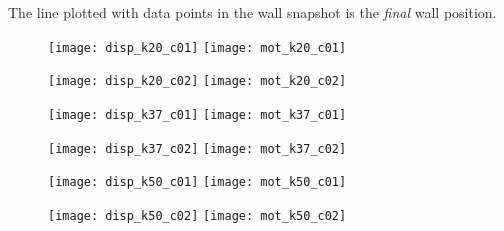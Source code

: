 \documentclass[a4paper,10pt]{article}
\begin{document}
The line plotted with data points in the wall snapshot is the \emph{final} wall position.

\begin{figure}[htb]
\centering
 \texttt{[image: disp\_k20\_c01]}
 \texttt{[image: mot\_k20\_c01]}
\end{figure}

\begin{figure}[htb]
\centering
 \texttt{[image: disp\_k20\_c02]}
 \texttt{[image: mot\_k20\_c02]}
\end{figure}

\begin{figure}[htb]
\centering
 \texttt{[image: disp\_k37\_c01]}
 \texttt{[image: mot\_k37\_c01]}
\end{figure}

\begin{figure}[htb]
\centering
 \texttt{[image: disp\_k37\_c02]}
 \texttt{[image: mot\_k37\_c02]}
\end{figure}

\begin{figure}[htb]
\centering
 \texttt{[image: disp\_k50\_c01]}
 \texttt{[image: mot\_k50\_c01]}
\end{figure}

\begin{figure}[htb]
\centering
 \texttt{[image: disp\_k50\_c02]}
 \texttt{[image: mot\_k50\_c02]}
\end{figure}
\end{document}
